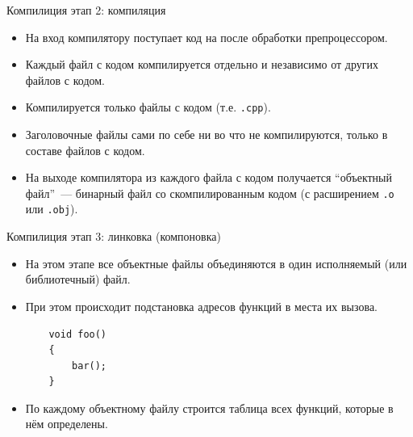 \documentclass[aspectration=1610,t]{beamer}
\begin{document}
\begin{frame}[fragile]{Компилиция этап  2: компиляция}
    \begin{itemize}
        \item На вход компилятору поступает код на \langcpp после обработки
            препроцессором.
        \item Каждый файл с кодом компилируется отдельно и независимо от других
            файлов с кодом.
        \item Компилируется только файлы с кодом (т.е. {\tt *.cpp}).
        \item Заголовочные файлы сами по себе ни во что не компилируются, только в
            составе файлов с кодом.
        \item На выходе компилятора из каждого файла с кодом получается ``объектный
            файл''~--- бинарный файл со скомпилированным кодом (с расширением
            \texttt{.o} или \texttt{.obj}).
    \end{itemize}
\end{frame}

\begin{frame}[fragile]{Компилиция этап 3: линковка (компоновка)}
    \begin{itemize}
        \item На этом этапе все объектные файлы объединяются в один исполняемый 
            (или библиотечный) файл.
        \item При этом происходит подстановка адресов функций в места их вызова.
        \begin{lstlisting}
    void foo()
    {
        bar();
    }
    \end{lstlisting}
        \item По каждому объектному файлу строится таблица всех
            функций, которые в нём определены.
    \end{itemize}
\end{frame}
\end{document}
